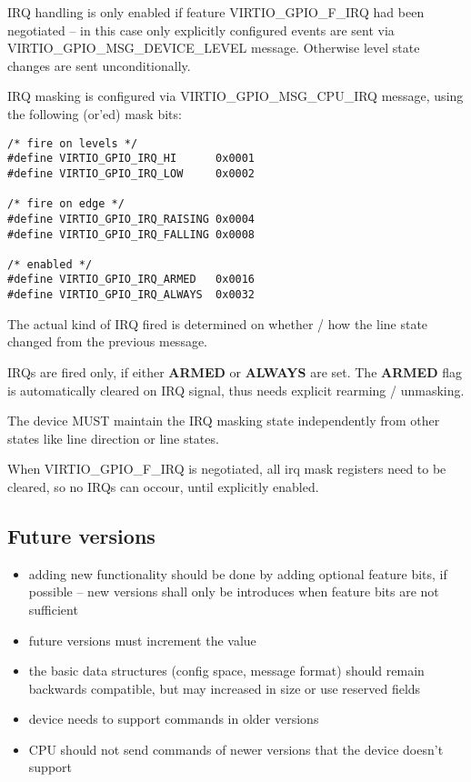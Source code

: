 IRQ handling is only enabled if feature VIRTIO_GPIO_F_IRQ had been negotiated -- in
this case only explicitly configured events are sent via VIRTIO_GPIO_MSG_DEVICE_LEVEL
message. Otherwise level state changes are sent unconditionally.

IRQ masking is configured via VIRTIO_GPIO_MSG_CPU_IRQ message, using the following
(or'ed) mask bits:

\begin{lstlisting}
/* fire on levels */
#define VIRTIO_GPIO_IRQ_HI      0x0001
#define VIRTIO_GPIO_IRQ_LOW     0x0002

/* fire on edge */
#define VIRTIO_GPIO_IRQ_RAISING 0x0004
#define VIRTIO_GPIO_IRQ_FALLING 0x0008

/* enabled */
#define VIRTIO_GPIO_IRQ_ARMED   0x0016
#define VIRTIO_GPIO_IRQ_ALWAYS  0x0032
\end{lstlisting}

The actual kind of IRQ fired is determined on whether / how the line state changed
from the previous message.

IRQs are fired only, if either \textbf{ARMED} or \textbf{ALWAYS} are set. The
\textbf{ARMED} flag is automatically cleared on IRQ signal, thus needs explicit
rearming / unmasking.


The device MUST maintain the IRQ masking state independently from other states like
line direction or line states.

When VIRTIO_GPIO_F_IRQ is negotiated, all irq mask registers need to be cleared,
so no IRQs can occour, until explicitly enabled.

\subsection{Future versions}\label{sec:Device Types / General Purpose IO / Future versions}

\begin{itemize}
    \item adding new functionality should be done by adding optional feature bits, if possible --
          new versions shall only be introduces when feature bits are not sufficient
    \item future versions must increment the  value
    \item the basic data structures (config space, message format) should remain
          backwards compatible, but may increased in size or use reserved fields
    \item device needs to support commands in older versions
    \item CPU should not send commands of newer versions that the device doesn't support
\end{itemize}

